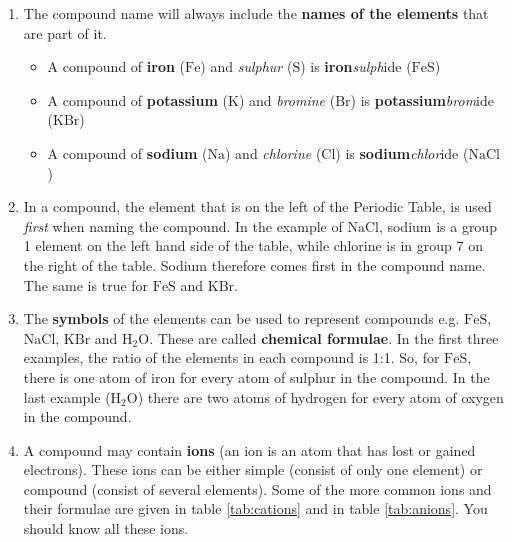       \label{m38708*id64037}\begin{enumerate}[noitemsep, label=\textbf{\arabic*}. ] 
            \label{m38708*uid35}\item The compound name will always include the \textbf{names of the elements} that are part of it.
\label{m38708*id64059}\begin{itemize}[noitemsep]
            \label{m38708*uid36}\item A compound of \textbf{iron} ($\text{Fe}$) and \textsl{sulphur} ($\text{S}$) is \textbf{iron}\hspace{1ex}\textsl{sulph}ide ($\text{FeS}$)
\label{m38708*uid37}\item A compound of \textbf{potassium} ($\text{K}$) and \textsl{bromine} ($\text{Br}$) is \textbf{potassium}\hspace{1ex}\textsl{brom}ide ($\text{KBr}$)
\label{m38708*uid38}\item A compound of \textbf{sodium} ($\text{Na}$) and \textsl{chlorine} ($\text{Cl}$) is \textbf{sodium}\hspace{1ex}\textsl{chlor}ide ($\text{NaCl}$)
\end{itemize}
        \label{m38708*uid39}\item In a compound, the element that is on the left of the Periodic Table, is used \textsl{first} when naming the compound. In the example of $\text{NaCl}$, sodium is a group 1 element on the left hand side of the table, while chlorine is in group 7 on the right of the table. Sodium therefore comes first in the compound name. The same is true for $\text{FeS}$ and $\text{KBr}$.
\label{m38708*uid40}\item The \textbf{symbols} of the elements can be used to represent compounds e.g. $\text{FeS}$, $\text{NaCl}$, $\text{KBr}$ and $\text{H}{}_{2}\text{O}$. These are called \textbf{chemical formulae}. In the first three examples, the ratio of the elements in each compound is 1:1. So, for $\text{FeS}$, there is one atom of iron for every atom of sulphur in the compound. In the last example ($\text{H}{}_{2}\text{O}$) there are two atoms of hydrogen for every atom of oxygen in the compound.
\item A compound may contain \textbf{ions} (an ion is an atom that has lost or gained electrons). These ions can be either simple (consist of only one element) or compound (consist of several elements). Some of the more common ions and their formulae are given in table \ref{tab:cations} and in table \ref{tab:anions}. You should know all these ions.\\


\end{enumerate}
